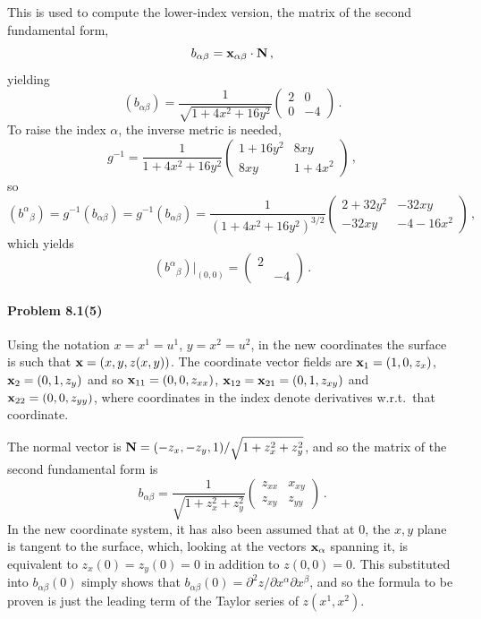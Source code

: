 \documentclass[a4paper,12pt]{article}
\newcommand{\problem}[1]{\paragraph{Problem #1}}
\begin{document}
This is used to compute the lower-index version, the matrix of the second fundamental form,
\[
 b_{\alpha\beta} = {\bf x}_{\alpha\beta}\cdot {\bf N}\,,
\]
yielding
\[
 (b_{\alpha\beta}) = \frac{1}{\sqrt{1+4x^2+16y^2}}\begin{pmatrix}2 & 0 \\ 0 & -4\end{pmatrix}\,.
\]
To raise the index $\alpha$, the inverse metric is needed,
\[
 g^{-1} = \frac{1}{1+4 x^2+16y^2}\begin{pmatrix}1+16y^2 & 8 xy \\ 8xy & 1+4x^2\end{pmatrix}\,,
\]
so
\[
 (b^\alpha{}_\beta)=g^{-1}(b_{\alpha\beta}) = g^{-1}(b_{\alpha\beta}) = \frac{1}{(1+4x^2+16y^2)^{3/2}}\begin{pmatrix}2 + 32y^2 & -32 xy \\ -32 xy & -4-16x^2\end{pmatrix}\,,
\]
which yields
\[
 (b^\alpha{}_\beta)\big|_{(0, 0)} =\begin{pmatrix} 2 & \\  & -4 \end{pmatrix}\,.
\]


\problem{8.1(5)} Using the notation $x=x^1=u^1$, $y=x^2=u^2$, in the new coordinates the surface is such that ${\bf x} = (x, y, z(x, y))$. The coordinate vector fields are ${\bf x}_1=(1,0,z_x)$, ${\bf x}_2=(0, 1, z_y)$ and so
${\bf x}_{11} = (0, 0, z_{xx})$, ${\bf x}_{12} = {\bf x}_{21} = (0, 1, z_{xy})$ and ${\bf x}_{22}=(0, 0, z_{yy})$, where coordinates in the index denote derivatives w.r.t.\ that coordinate.

The normal vector is ${\bf N} = (-z_x, -z_y,1)/\sqrt{1+z_x^2+z_y^2}$, and so the matrix of the second fundamental form is
\[
 {b_{\alpha\beta}} = \frac{1}{\sqrt{1+z_x^2+z_y^2}}\begin{pmatrix}
  z_{xx} & x_{xy} \\ z_{xy} & z_{yy}
 \end{pmatrix}\,.
\]
In the new coordinate system, it has also been assumed that at 0, the $x, y$ plane is tangent to the surface, which, looking at the vectors ${\bf x}_\alpha$ spanning it, is equivalent to $z_x(0)=z_y(0)=0$ in addition to $z(0,0)=0$. This substituted into $b_{\alpha\beta}(0)$ simply shows that $b_{\alpha\beta}(0) = \partial^2 z/\partial x^\alpha\partial x^\beta$, and so the formula to be proven is just the leading term of the Taylor series of $z(x^1, x^2)$.
\end{document}
